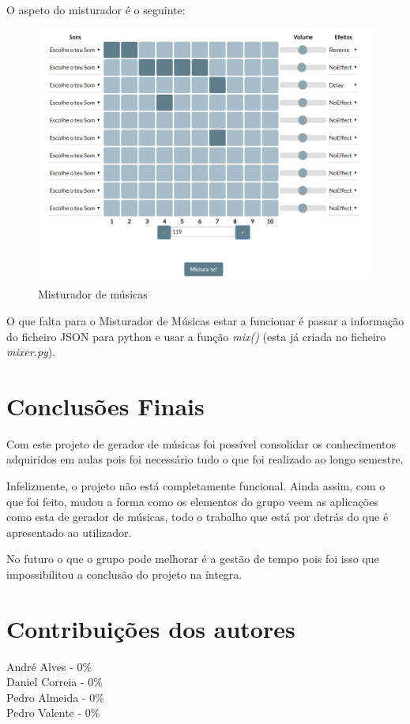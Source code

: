 \documentclass{report}
\begin{document}
O aspeto do misturador é o seguinte:

	\begin{figure} [h]
		\centering
		\includegraphics[scale=0.5]{img/misturador.PNG}
		\caption{Misturador de músicas}
	\end{figure}

O que falta para o Misturador de Músicas estar a funcionar é passar a informação do ficheiro JSON para python e usar a função \textit{mix()} (esta já criada no ficheiro \textit{mixer.py}).

	 
\chapter{Conclusões Finais}
\label{chap.conclusao}
	Com este projeto de gerador de músicas foi possível consolidar os conhecimentos adquiridos em aulas pois foi necessário tudo o que foi realizado ao longo semestre. 
	
	Infelizmente, o projeto não está completamente funcional. Ainda assim, com o que foi feito, mudou a forma como os elementos do grupo veem as aplicações como esta de gerador de músicas, todo o trabalho que está por detrás do que é apresentado ao utilizador.  
	
	No futuro o que o grupo pode melhorar é a gestão de tempo pois foi isso que impossibilitou a conclusão do projeto na íntegra.


\chapter{Contribuições dos autores}
\label{contribuições}

\noindent
André Alves - 0\% \\
Daniel Correia - 0\% \\
Pedro Almeida - 0\% \\
Pedro Valente - 0\% 
\end{document}
